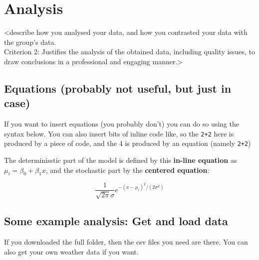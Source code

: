 \documentclass[]{article}
\begin{document}
\hypertarget{analysis}{%
\section{Analysis}\label{analysis}}

\textless describe how you analysed your data, and how you contrasted
your data with the group's data.\\
Criterion 2: Justifies the analysis of the obtained data, including
quality issues, to draw conclusions in a professional and engaging
manner.\textgreater{}

\hypertarget{equations-probably-not-useful-but-just-in-case}{%
\subsection{Equations (probably not useful, but just in
case)}\label{equations-probably-not-useful-but-just-in-case}}

If you want to insert equations (you probably don't) you can do so using
the syntax below. You can also insert bits of inline code like, so the
\texttt{2+2} here is produced by a piece of code, and the 4 is produced
by an equation (namely \texttt{2+2})

The determinisstic part of the model is defined by this \textbf{in-line
equation} as \(\mu_i = \beta_0 + \beta_1x\), and the stochastic part by
the \textbf{centered equation}:

\[ \frac{1}{\sqrt{2\pi}\sigma}e^{-(x-\mu_i)^2/(2\sigma^2)} \]

\hypertarget{some-example-analysis-get-and-load-data}{%
\subsection{Some example analysis: Get and load
data}\label{some-example-analysis-get-and-load-data}}

If you downloaded the full folder, then the csv files you need are
there. You can also get your own weather data if you want.
\end{document}
